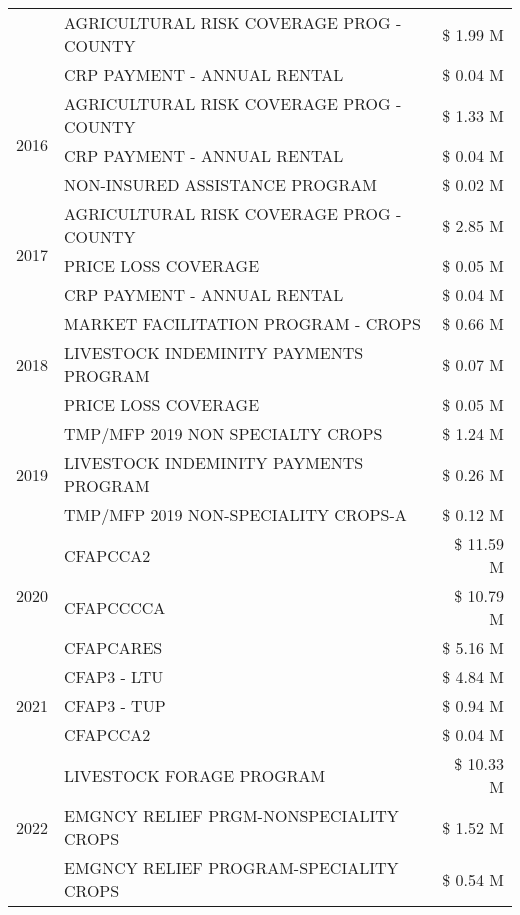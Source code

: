 \begin{tabular}{llr}
 & AGRICULTURAL RISK COVERAGE PROG - COUNTY & \$ 1.99 M \\
 & CRP PAYMENT - ANNUAL RENTAL & \$ 0.04 M \\
\cline{1-3}
\multirow[t]{3}{*}{2016} & AGRICULTURAL RISK COVERAGE PROG - COUNTY & \$ 1.33 M \\
 & CRP PAYMENT - ANNUAL RENTAL & \$ 0.04 M \\
 & NON-INSURED ASSISTANCE PROGRAM & \$ 0.02 M \\
\cline{1-3}
\multirow[t]{3}{*}{2017} & AGRICULTURAL RISK COVERAGE PROG - COUNTY & \$ 2.85 M \\
 & PRICE LOSS COVERAGE & \$ 0.05 M \\
 & CRP PAYMENT - ANNUAL RENTAL & \$ 0.04 M \\
\cline{1-3}
\multirow[t]{3}{*}{2018} & MARKET FACILITATION PROGRAM - CROPS & \$ 0.66 M \\
 & LIVESTOCK INDEMINITY PAYMENTS PROGRAM & \$ 0.07 M \\
 & PRICE LOSS COVERAGE & \$ 0.05 M \\
\cline{1-3}
\multirow[t]{3}{*}{2019} & TMP/MFP 2019 NON SPECIALTY CROPS & \$ 1.24 M \\
 & LIVESTOCK INDEMINITY PAYMENTS PROGRAM & \$ 0.26 M \\
 & TMP/MFP 2019 NON-SPECIALITY CROPS-A & \$ 0.12 M \\
\cline{1-3}
\multirow[t]{3}{*}{2020} & CFAPCCA2 & \$ 11.59 M \\
 & CFAPCCCCA & \$ 10.79 M \\
 & CFAPCARES & \$ 5.16 M \\
\cline{1-3}
\multirow[t]{3}{*}{2021} & CFAP3 - LTU & \$ 4.84 M \\
 & CFAP3 - TUP & \$ 0.94 M \\
 & CFAPCCA2 & \$ 0.04 M \\
\cline{1-3}
\multirow[t]{3}{*}{2022} & LIVESTOCK FORAGE PROGRAM & \$ 10.33 M \\
 & EMGNCY RELIEF PRGM-NONSPECIALITY CROPS & \$ 1.52 M \\
 & EMGNCY RELIEF PROGRAM-SPECIALITY CROPS & \$ 0.54 M \\
\cline{1-3}
\bottomrule
\end{tabular}
